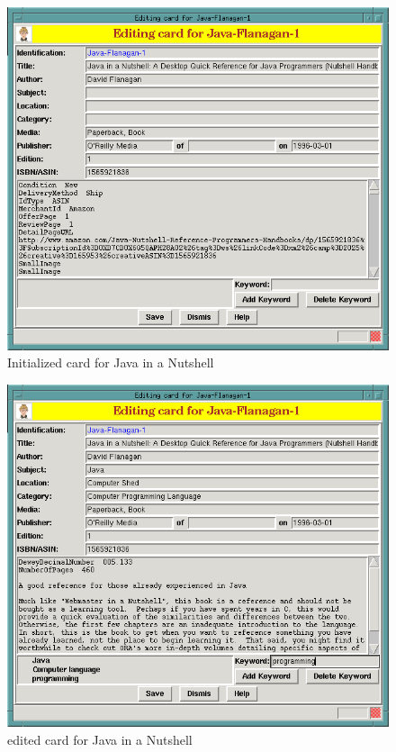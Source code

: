 \begin{figure}[hpt]
\begin{centering}
\includegraphics[width=5in]{Java-Flanagan-1-Initial.png}
\caption{Initialized card for Java in a Nutshell}
\label{fig:tut:javaflanagan1initial}
\end{centering}
\end{figure}
\begin{figure}[hpt]
\begin{centering}
\includegraphics[width=5in]{Java-Flanagan-1-Edited.png}
\caption{edited card for Java in a Nutshell}
\label{fig:tut:javaflanagan1editedl}
\end{centering}
\end{figure}
